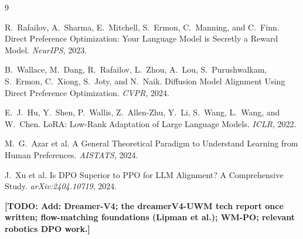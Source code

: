 \documentclass[11pt]{article}
\newcommand{\todo}[1]{\textbf{[TODO: #1]}}
\begin{document}

\begin{thebibliography}{9}

R.\ Rafailov, A.\ Sharma, E.\ Mitchell, S.\ Ermon, C.\ Manning, and C.\ Finn.
\newblock Direct Preference Optimization: Your Language Model is Secretly a Reward Model.
\newblock \emph{NeurIPS}, 2023.

B.\ Wallace, M.\ Dang, R.\ Rafailov, L.\ Zhou, A.\ Lou, S.\ Purushwalkam, S.\ Ermon, C.\ Xiong, S.\ Joty, and N.\ Naik.
\newblock Diffusion Model Alignment Using Direct Preference Optimization.
\newblock \emph{CVPR}, 2024.

E.\ J.\ Hu, Y.\ Shen, P.\ Wallis, Z.\ Allen-Zhu, Y.\ Li, S.\ Wang, L.\ Wang, and W.\ Chen.
\newblock LoRA: Low-Rank Adaptation of Large Language Models.
\newblock \emph{ICLR}, 2022.

M.\ G.\ Azar et al.
\newblock A General Theoretical Paradigm to Understand Learning from Human Preferences.
\newblock \emph{AISTATS}, 2024.

J.\ Xu et al.
\newblock Is DPO Superior to PPO for LLM Alignment? A Comprehensive Study.
\newblock \emph{arXiv:2404.10719}, 2024.

\todo{Add: Dreamer-V4; the dreamerV4-UWM tech report once written; flow-matching foundations (Lipman et al.); WM-PO; relevant robotics DPO work.}

\end{thebibliography}
\end{document}
